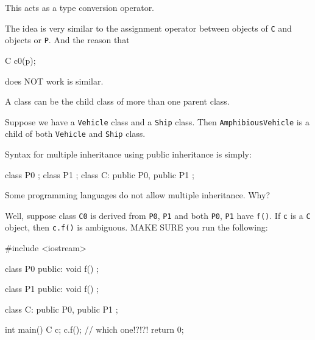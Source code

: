 This acts as a type conversion operator.

The idea is very similar to the assignment operator between objects of
\verb!C! and objects or \verb!P!. And the reason that
\begin{console}
C c0(p);
\end{console}

does NOT work is similar.

\newpage{}

A class can be the child class of more than one parent class.

Suppose we have a \verb!Vehicle! class and a \verb!Ship! class. Then \verb!AmphibiousVehicle! is a child of both \verb!Vehicle! and \verb!Ship! class.

Syntax for multiple inheritance using public inheritance is simply:

\begin{console}
class P0 {};
class P1 {};
class C: public P0, public P1 {}; 
\end{console}

Some programming languages do not allow multiple inheritance. Why?

Well, suppose class \verb!C0! is derived from \verb!P0!, \verb!P1! and both \verb!P0!, \verb!P1! have \verb!f()!. If \verb!c! is a \verb!C! object, then \verb!c.f()! is ambiguous. MAKE SURE you run the following:
\begin{console}
#include <iostream>

class P0
{
public:
        void f() {}
};

class P1
{
public:
        void f() {}
};

class C: public P0, public P1
{};

int main()
{   
    C c;
    c.f(); // which one!?!?!
    return 0;
}
\end{console}

